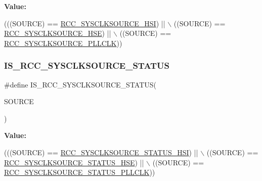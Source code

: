 {\bfseries Value\+:}
\begin{DoxyCode}
(((SOURCE) == \hyperlink{group___r_c_c___system___clock___source_gaaeeb699502e7d7a9f1b5d57fcf1f5095}{RCC\_SYSCLKSOURCE\_HSI})    || \(\backslash\)
                                      ((SOURCE) == \hyperlink{group___r_c_c___system___clock___source_ga9116d0627e1e7f33c48e1357b9a35a1c}{RCC\_SYSCLKSOURCE\_HSE})    || \(\backslash\)
                                      ((SOURCE) == \hyperlink{group___r_c_c___system___clock___source_ga5caf08ac71d7dd7e7b2e3e421606aca7}{RCC\_SYSCLKSOURCE\_PLLCLK}))
\end{DoxyCode}
\mbox{\label{group___r_c_c___private___macros_ga55fe3ff7663af37558fe49d92f670ebe}} 
\subsubsection{\texorpdfstring{I\+S\+\_\+\+R\+C\+C\+\_\+\+S\+Y\+S\+C\+L\+K\+S\+O\+U\+R\+C\+E\+\_\+\+S\+T\+A\+T\+US}{IS\_RCC\_SYSCLKSOURCE\_STATUS}}
{\footnotesize\ttfamily \#define I\+S\+\_\+\+R\+C\+C\+\_\+\+S\+Y\+S\+C\+L\+K\+S\+O\+U\+R\+C\+E\+\_\+\+S\+T\+A\+T\+US(\begin{DoxyParamCaption}\item[{}]{S\+O\+U\+R\+CE }\end{DoxyParamCaption})}

{\bfseries Value\+:}
\begin{DoxyCode}
(((SOURCE) == \hyperlink{group___r_c_c___system___clock___source___status_ga0d6c2b0b2d59e6591295649853bb2abd}{RCC\_SYSCLKSOURCE\_STATUS\_HSI})    || \(\backslash\)
                                            ((SOURCE) == 
      \hyperlink{group___r_c_c___system___clock___source___status_ga3847769265bf19becf7b976a7e908a64}{RCC\_SYSCLKSOURCE\_STATUS\_HSE})    || \(\backslash\)
                                            ((SOURCE) == 
      \hyperlink{group___r_c_c___system___clock___source___status_ga4f05019ec09da478d084f44dbaad7d6d}{RCC\_SYSCLKSOURCE\_STATUS\_PLLCLK}))
\end{DoxyCode}
\mbox{\label{group___r_c_c___private___macros_ga6003fec797edb43f2d69424cf9da6a2b}} 

